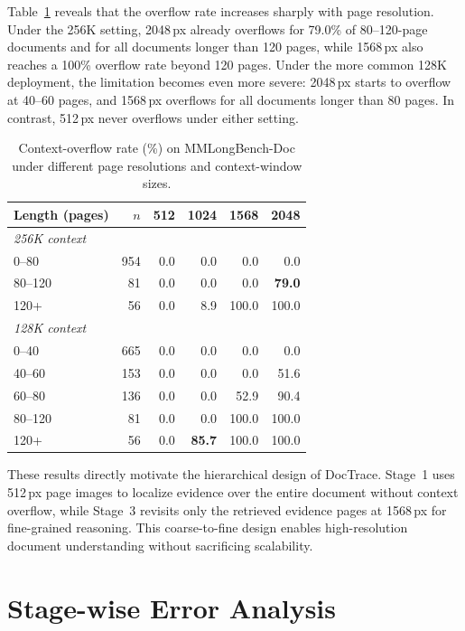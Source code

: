 \documentclass[letterpaper]{article} %
\begin{document}
Table~\ref{tab:overflow} reveals that the overflow rate increases sharply with page resolution. Under the 256K setting, 2048\,px already overflows for 79.0\% of 80--120-page documents and for all documents longer than 120 pages, while 1568\,px also reaches a 100\% overflow rate beyond 120 pages. Under the more common 128K deployment, the limitation becomes even more severe: 2048\,px starts to overflow at 40--60 pages, and 1568\,px overflows for all documents longer than 80 pages. In contrast, 512\,px never overflows under either setting.
\begin{table}[h]
\centering

\begin{tabular}{lrrrrr}
\toprule
\textbf{Length (pages)} & \textbf{$n$} & \textbf{512} & \textbf{1024} & \textbf{1568} & \textbf{2048} \\
\midrule
\multicolumn{6}{l}{\emph{256K context}}\\
0--80    & 954 & 0.0 & 0.0 & 0.0   & 0.0 \\
80--120  &  81 & 0.0 & 0.0 & 0.0   & \textbf{79.0} \\
120+     &  56 & 0.0 & 8.9 & 100.0 & 100.0 \\
\midrule
\multicolumn{6}{l}{\emph{128K context}}\\
0--40    & 665 & 0.0 & 0.0 & 0.0   & 0.0 \\
40--60   & 153 & 0.0 & 0.0 & 0.0   & 51.6 \\
60--80   & 136 & 0.0 & 0.0 & 52.9  & 90.4 \\
80--120  &  81 & 0.0 & 0.0 & 100.0 & 100.0 \\
120+     &  56 & 0.0 & \textbf{85.7} & 100.0 & 100.0 \\
\bottomrule
\end{tabular}
\caption{
Context-overflow rate (\%) on MMLongBench-Doc under different page resolutions
and context-window sizes.}
\label{tab:overflow}
\end{table}


These results directly motivate the hierarchical design of DocTrace. Stage~1 uses 512\,px page images to localize evidence over the entire document without context overflow, while Stage~3 revisits only the retrieved evidence pages at 1568\,px for fine-grained reasoning. This coarse-to-fine design enables high-resolution document understanding without sacrificing scalability.





\section{Stage-wise Error Analysis}
\end{document}
